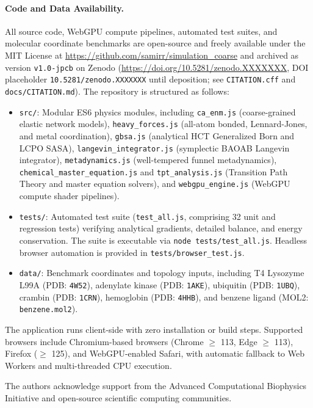 \documentclass[journal=jpcbfk,manuscript=article,layout=twocolumn]{achemso}
\begin{document}
\paragraph{Code and Data Availability.}
All source code, WebGPU compute pipelines, automated test suites, and molecular coordinate benchmarks are open-source and freely available under the MIT License at \url{https://github.com/samirr/simulation_coarse} and archived as version \texttt{v1.0-jpcb} on Zenodo (\url{https://doi.org/10.5281/zenodo.XXXXXXX}, DOI placeholder \texttt{10.5281/zenodo.XXXXXXX} until deposition; see \texttt{CITATION.cff} and \texttt{docs/CITATION.md}). The repository is structured as follows:
\begin{itemize}
\item \texttt{src/}: Modular ES6 physics modules, including \texttt{ca\_enm.js} (coarse-grained elastic network models), \texttt{heavy\_forces.js} (all-atom bonded, Lennard-Jones, and metal coordination), \texttt{gbsa.js} (analytical HCT Generalized Born and LCPO SASA), \texttt{langevin\_integrator.js} (symplectic BAOAB Langevin integrator), \texttt{metadynamics.js} (well-tempered funnel metadynamics), \texttt{chemical\_master\_equation.js} and \texttt{tpt\_analysis.js} (Transition Path Theory and master equation solvers), and \texttt{webgpu\_engine.js} (WebGPU compute shader pipelines).
\item \texttt{tests/}: Automated test suite (\texttt{test\_all.js}, comprising 32 unit and regression tests) verifying analytical gradients, detailed balance, and energy conservation. The suite is executable via \texttt{node tests/test\_all.js}. Headless browser automation is provided in \texttt{tests/browser\_test.js}.
\item \texttt{data/}: Benchmark coordinates and topology inputs, including T4 Lysozyme L99A (PDB: \texttt{4W52}), adenylate kinase (PDB: \texttt{1AKE}), ubiquitin (PDB: \texttt{1UBQ}), crambin (PDB: \texttt{1CRN}), hemoglobin (PDB: \texttt{4HHB}), and benzene ligand (MOL2: \texttt{benzene.mol2}).
\end{itemize}
The application runs client-side with zero installation or build steps. Supported browsers include Chromium-based browsers (Chrome $\ge$ 113, Edge $\ge$ 113), Firefox ($\ge$ 125), and WebGPU-enabled Safari, with automatic fallback to Web Workers and multi-threaded CPU execution.

\begin{acknowledgement}
The authors acknowledge support from the Advanced Computational Biophysics Initiative and open-source scientific computing communities.
\end{acknowledgement}


\end{document}
